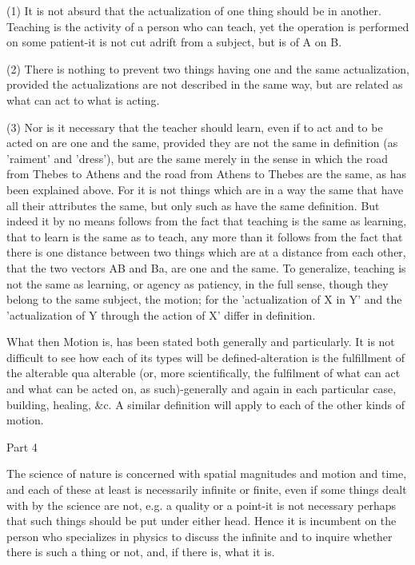 (1) It is not absurd that the actualization of one thing should be
in another. Teaching is the activity of a person who can teach, yet
the operation is performed on some patient-it is not cut adrift from
a subject, but is of A on B. 

(2) There is nothing to prevent two things having one and the same
actualization, provided the actualizations are not described in the
same way, but are related as what can act to what is acting.

(3) Nor is it necessary that the teacher should learn, even if to
act and to be acted on are one and the same, provided they are not
the same in definition (as 'raiment' and 'dress'), but are the same
merely in the sense in which the road from Thebes to Athens and the
road from Athens to Thebes are the same, as has been explained above.
For it is not things which are in a way the same that have all their
attributes the same, but only such as have the same definition. But
indeed it by no means follows from the fact that teaching is the same
as learning, that to learn is the same as to teach, any more than
it follows from the fact that there is one distance between two things
which are at a distance from each other, that the two vectors AB and
Ba, are one and the same. To generalize, teaching is not the same
as learning, or agency as patiency, in the full sense, though they
belong to the same subject, the motion; for the 'actualization of
X in Y' and the 'actualization of Y through the action of X' differ
in definition. 

What then Motion is, has been stated both generally and particularly.
It is not difficult to see how each of its types will be defined-alteration
is the fulfillment of the alterable qua alterable (or, more scientifically,
the fulfilment of what can act and what can be acted on, as such)-generally
and again in each particular case, building, healing, &c. A similar
definition will apply to each of the other kinds of motion.

Part 4

The science of nature is concerned with spatial magnitudes and motion
and time, and each of these at least is necessarily infinite or finite,
even if some things dealt with by the science are not, e.g. a quality
or a point-it is not necessary perhaps that such things should be
put under either head. Hence it is incumbent on the person who specializes
in physics to discuss the infinite and to inquire whether there is
such a thing or not, and, if there is, what it is. 

